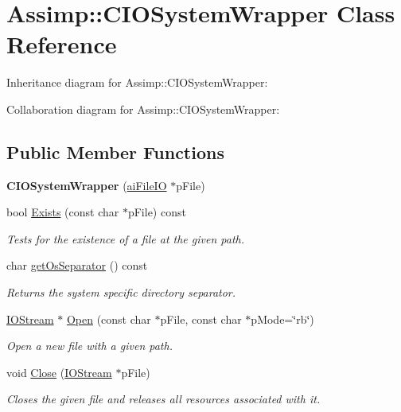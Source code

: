 \hypertarget{class_assimp_1_1_c_i_o_system_wrapper}{\section{Assimp\+:\+:C\+I\+O\+System\+Wrapper Class Reference}
\label{class_assimp_1_1_c_i_o_system_wrapper}
}


Inheritance diagram for Assimp\+:\+:C\+I\+O\+System\+Wrapper\+:


Collaboration diagram for Assimp\+:\+:C\+I\+O\+System\+Wrapper\+:
\subsection*{Public Member Functions}
\begin{DoxyCompactItemize}
\item 
\hypertarget{class_assimp_1_1_c_i_o_system_wrapper_ae7e9dc84bdfe9d97628f05fcf9e48a79}{{\bfseries C\+I\+O\+System\+Wrapper} (\hyperlink{structai_file_i_o}{ai\+File\+I\+O} $\ast$p\+File)}\label{class_assimp_1_1_c_i_o_system_wrapper_ae7e9dc84bdfe9d97628f05fcf9e48a79}

\item 
bool \hyperlink{class_assimp_1_1_c_i_o_system_wrapper_a7385d5f622fdbe1db94d7fdcc5aa3b37}{Exists} (const char $\ast$p\+File) const 
\begin{DoxyCompactList}\small\item\em Tests for the existence of a file at the given path. \end{DoxyCompactList}\item 
char \hyperlink{class_assimp_1_1_c_i_o_system_wrapper_a1655bf6de8a725393fc4ab30dc86a092}{get\+Os\+Separator} () const 
\begin{DoxyCompactList}\small\item\em Returns the system specific directory separator. \end{DoxyCompactList}\item 
\hyperlink{class_assimp_1_1_i_o_stream}{I\+O\+Stream} $\ast$ \hyperlink{class_assimp_1_1_c_i_o_system_wrapper_a7fdb74a36db7cb2959e58ac8ab5a53df}{Open} (const char $\ast$p\+File, const char $\ast$p\+Mode=\char`\"{}rb\char`\"{})
\begin{DoxyCompactList}\small\item\em Open a new file with a given path. \end{DoxyCompactList}\item 
void \hyperlink{class_assimp_1_1_c_i_o_system_wrapper_a6aa99720fd1e7fbeb637b8e06c48ef83}{Close} (\hyperlink{class_assimp_1_1_i_o_stream}{I\+O\+Stream} $\ast$p\+File)
\begin{DoxyCompactList}\small\item\em Closes the given file and releases all resources associated with it. \end{DoxyCompactList}\end{DoxyCompactItemize}


